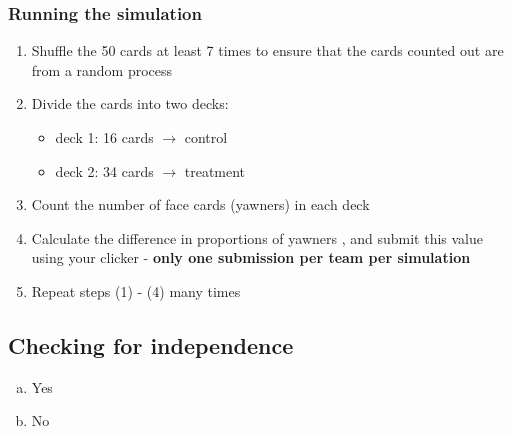 \documentclass[slidestop,compress,mathserif,12pt,t,professionalfonts,xcolor=table]{beamer}
\begin{document}

\begin{frame}
\frametitle{Running the simulation}

\begin{enumerate}

\item Shuffle the 50 cards at least 7 times to ensure that the cards counted out are from a random process

\item Divide the cards into two decks:
\begin{itemize}
\item deck 1: 16 cards $\rightarrow$ control
\item deck 2: 34 cards $\rightarrow$ treatment
\end{itemize}

\item Count the number of face cards (yawners) in each deck

\item Calculate the difference in proportions of yawners , and submit this value using your clicker - \textbf{only one submission per team per simulation}

\item Repeat steps (1) - (4) many times

\end{enumerate}

\vfill


\end{frame}


\subsection{Checking for independence}

\begin{frame}


\begin{multicols}{2}
\begin{enumerate}[(a)]
\item Yes
\item No
\end{enumerate}
\end{multicols}

\end{frame}
\end{document}
